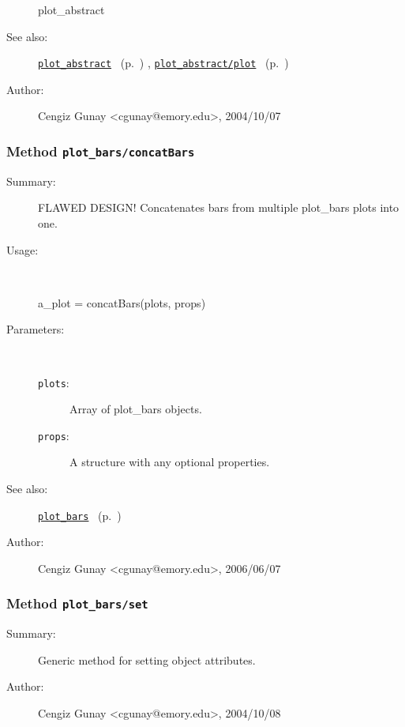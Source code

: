 \begin{description}
	plot\_abstract
%
%
\item[See also:]%
\hyperlink{ref_plot_abstract}{\texttt{plot\_abstract}}%
\ (p.~\pageref{ref_plot_abstract})%
%
, \hyperlink{ref_plot_abstract__plot}{\texttt{plot\_abstract/plot}}%
\ (p.~\pageref{ref_plot_abstract__plot})%
%
%
\item[Author:]%
Cengiz Gunay <cgunay@emory.edu>, 2004/10/07%
\end{description}
\methodline%
\subsubsection[Method \texttt{concatBars}]{Method \texttt{plot\_bars/concatBars}}%
%
\label{ref_plot_bars__concatBars}%
\hypertarget{ref_plot_bars__concatBars}{}%
\begin{description}
\item[Summary:]FLAWED DESIGN! Concatenates bars from multiple plot\_bars plots into one.
%
\item[Usage:]~%
\begin{lyxcode}%
a\_plot = concatBars(plots, props)
%
\end{lyxcode}%
%
%
\item[Parameters:]~
\begin{description}%
\item[\texttt{plots}:]
 Array of plot\_bars objects.
\item[\texttt{props}:]
 A structure with any optional properties.
\end{description}%
%
%
%
\item[See also:]%
\hyperlink{ref_plot_bars}{\texttt{plot\_bars}}%
\ (p.~\pageref{ref_plot_bars})%
%
%
\item[Author:]%
Cengiz Gunay <cgunay@emory.edu>, 2006/06/07%
\end{description}
\methodline%
\subsubsection[Method \texttt{set}]{Method \texttt{plot\_bars/set}}%
%
\label{ref_plot_bars__set}%
\hypertarget{ref_plot_bars__set}{}%
\begin{description}
\item[Summary:]Generic method for setting object attributes.
%
%
%
%
%
%
%
\item[Author:]%
Cengiz Gunay <cgunay@emory.edu>, 2004/10/08%
\end{description}
\methodline%
